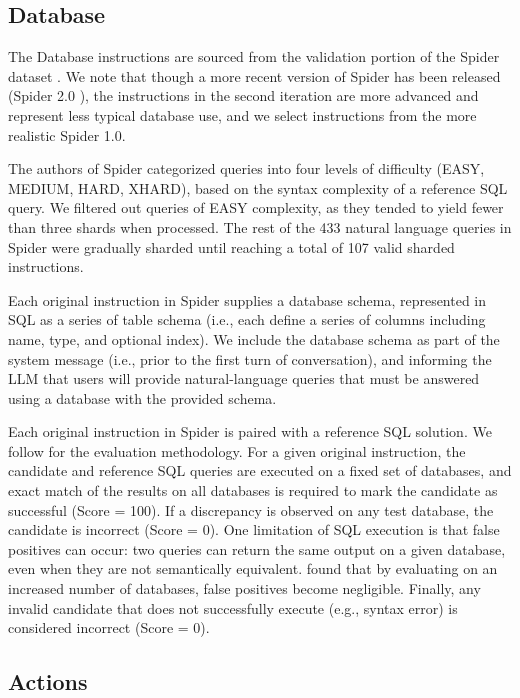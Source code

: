 \documentclass{article}
\begin{document}
\begin{appendices}
\subsection{\texorpdfstring{\database Database}{Database}}

The Database instructions are sourced from the validation portion of the Spider dataset \cite{yu2018spider}. We note that though a more recent version of Spider has been released (Spider 2.0 \cite{lei2024spider}), the instructions in the second iteration are more advanced and represent less typical database use, and we select instructions from the more realistic Spider 1.0.

The authors of Spider categorized queries into four levels of difficulty (EASY, MEDIUM, HARD, XHARD), based on the syntax complexity of a reference SQL query. We filtered out queries of EASY complexity, as they tended to yield fewer than three shards when processed. The rest of the 433 natural language queries in Spider were gradually sharded until reaching a total of 107 valid sharded instructions.

Each original instruction in Spider supplies a database schema, represented in SQL as a series of table schema (i.e., each define a series of columns including name, type, and optional index). We include the database schema as part of the system message (i.e., prior to the first turn of conversation), and informing the LLM that users will provide natural-language queries that must be answered using a database with the provided schema. 

Each original instruction in Spider is paired with a reference SQL solution. We follow \citet{zhong2020semantic} for the evaluation methodology. For a given original instruction, the candidate and reference SQL queries are executed on a fixed set of databases, and exact match of the results on all databases is required to mark the candidate as successful (Score = 100). If a discrepancy is observed on any test database, the candidate is incorrect (Score = 0). One limitation of SQL execution is that false positives can occur: two queries can return the same output on a given database, even when they are not semantically equivalent. \citet{zhong2020semantic} found that by evaluating on an  increased number of databases, false positives become negligible. Finally, any invalid candidate that does not successfully execute (e.g., syntax error) is considered incorrect (Score = 0).

\subsection{\texorpdfstring{\apis Actions}{Actions}}


\end{appendices}
\end{document}
